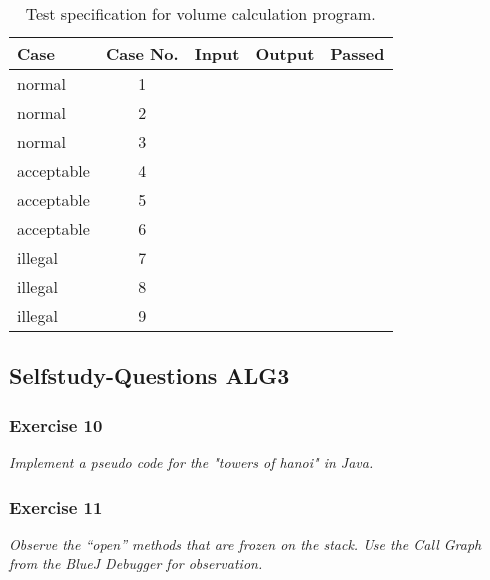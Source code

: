 \begin{table}
	\centering
	\begin{tabular}{l c p{4cm} p{4cm} c}
	Case & Case No. & Input & Output & Passed \\
	\hline
	normal 		& 1 & & & \\
	normal 		& 2 & & & \\
	normal 		& 3 & & & \\
	acceptable 	& 4 & & & \\
	acceptable 	& 5 & & & \\
	acceptable 	& 6 & & & \\
	illegal 	& 7 & & & \\
	illegal 	& 8 & & & \\
	illegal 	& 9 & & & \\
	\end{tabular}
	\caption{Test specification for volume calculation program.}
	\label{table:test-specification}
\end{table}


\subsection{Selfstudy-Questions ALG3}

\subsubsection*{Exercise 10}
\textit{Implement a pseudo code for the "towers of hanoi" in Java.} \\

\subsubsection*{Exercise 11}
\textit{Observe the "`open"' methods that are frozen on the stack.
Use the Call Graph from the BlueJ Debugger for observation.} \\
